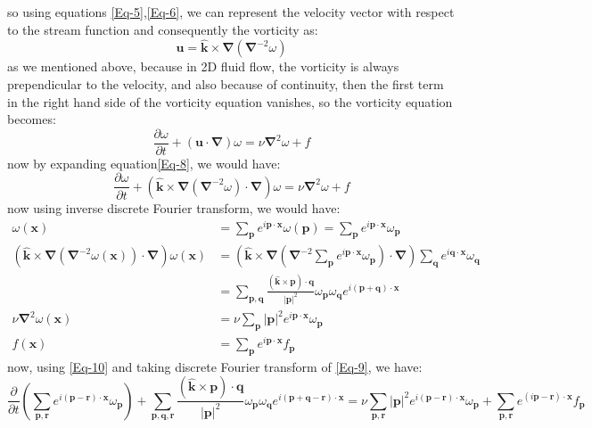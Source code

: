 \documentclass[10pt]{article}
\begin{document}
so using equations \eqref{Eq-5},\eqref{Eq-6}, we can represent the velocity vector with respect to the stream function and consequently the vorticity as:
%
\begin{equation}\label{Eq-7}
\bm{u}=\bm{\hat{k}}\times\bm{\nabla}({\bm{\nabla}}^{-2}\omega)
\end{equation}
%
as we mentioned above, because in 2D fluid flow, the vorticity is always prependicular to the velocity, and also because of continuity, then the first term in the right hand side of the vorticity equation vanishes, so the vorticity equation becomes:
%
\begin{equation}\label{Eq-8}
\frac{\partial{\omega}}{\partial t} + (\bm{u}\cdot\bm{\nabla})\omega= \nu\bm{\nabla}^2\omega + f
\end{equation}
%
now by expanding equation\eqref{Eq-8}, we would have:
%
\begin{equation}\label{Eq-9}
\frac{\partial{\omega}}{\partial t} + (\bm{\hat{k}}\times\bm{\nabla}({\bm{\nabla}}^{-2}\omega)\cdot\bm{\nabla})\omega= \nu\bm{\nabla}^2\omega + f
\end{equation}
now using inverse discrete Fourier transform, we would have:
%
\begin{align}
\omega(\bm{x})&=\sum_{\bm{p}}{e^{i\bm{p}\cdot\bm{x}}\omega(\bm{p})}=\sum_{\bm{p}}{e^{i\bm{p}\cdot\bm{x}}\omega_{\bm{p}}} \tag*{} \\
(\bm{\hat{k}}\times\bm{\nabla}({\bm{\nabla}}^{-2}\omega(\bm{x}))\cdot\bm{\nabla})\omega(\bm{x}) &=(\bm{\hat{k}}\times\bm{\nabla}({\bm{\nabla}}^{-2}\sum_{\bm{p}}{e^{i\bm{p}\cdot\bm{x}}\omega_{\bm{p}}})\cdot\bm{\nabla})\sum_{\bm{q}}{e^{i\bm{q}\cdot\bm{x}}\omega_{\bm{q}}} \tag*{} \\
&=\sum_{\bm{p},\bm{q}}{\frac{(\bm{\hat{k}}\times\bm{p})\cdot\bm{q}}{|\bm{p}|^2}\omega_{\bm{p}}\omega_{\bm{q}}e^{i(\bm{p}+\bm{q})\cdot\bm{x}}} \tag*{} \\
\nu\bm{\nabla}^2\omega(\bm{x})&=\nu\sum_{\bm{p}}{|\bm{p}|^2e^{i\bm{p}\cdot\bm{x}}\omega_{\bm{p}}}  \tag*{} \\
f(\bm{x})&=\sum_{\bm{p}}{e^{i\bm{p}\cdot\bm{x}}f_{\bm{p}}} \label{Eq-10}
\end{align}
%
now, using \eqref{Eq-10} and taking discrete Fourier transform of \eqref{Eq-9}, we have:
%
\begin{equation}\label{Eq-11}
\frac{\partial}{\partial t}({\sum_{\bm{p},\bm{r}}{e^{i(\bm{p}-\bm{r})\cdot\bm{x}}\omega_{\bm{p}}}}) + \sum_{\bm{p},\bm{q},\bm{r}}{\frac{(\bm{\hat{k}}\times\bm{p})\cdot\bm{q}}{|\bm{p}|^2}\omega_{\bm{p}}\omega_{\bm{q}}e^{i(\bm{p}+\bm{q}-\bm{r})\cdot\bm{x}}}= \nu\sum_{\bm{p},\bm{r}}{|\bm{p}|^2e^{i(\bm{p}-\bm{r})\cdot\bm{x}}\omega_{\bm{p}}} + \sum_{\bm{p},\bm{r}}{e^{(i\bm{p}-\bm{r})\cdot\bm{x}}f_{\bm{p}}}
\end{equation}
\end{document}
